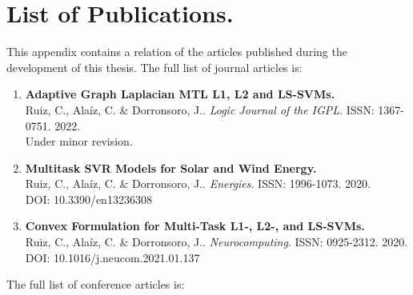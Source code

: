 


\chapter{List of Publications.}
\label{AppendixA}

This appendix contains a relation of the articles published during the development of this thesis.
%
The full list of journal articles is:
\begin{enumerate}
    \item \textbf{Adaptive Graph Laplacian MTL L1, L2 and
    LS-SVMs.}\\
    {Ruiz, C.}, Alaíz, C. \& Dorronsoro, J.. 
    \emph{Logic Journal of the IGPL}. ISSN: 1367-0751. 2022.\\
    Under minor revision.\\
    \item \textbf{Multitask SVR Models for Solar and Wind Energy.}\\
    {Ruiz, C.}, Alaíz, C. \& Dorronsoro, J.. 
    \emph{Energies}. ISSN: 1996-1073. 2020.\\
    DOI: 10.3390/en13236308\\
    \item \textbf{Convex Formulation for Multi-Task L1-, L2-, and LS-SVMs.}\\
    {Ruiz, C.}, Alaíz, C. \& Dorronsoro, J.. 
    \emph{Neurocomputing}. ISSN: 0925-2312. 2020.\\
    DOI: 10.1016/j.neucom.2021.01.137\\
\end{enumerate}
%
The full list of conference articles is:
